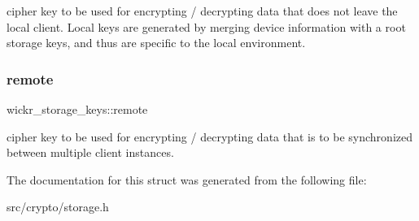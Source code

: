 cipher key to be used for encrypting / decrypting data that does not leave the local client. Local keys are generated by merging device information with a root storage keys, and thus are specific to the local environment. \mbox{\label{structwickr__storage__keys_a44b6a0b14bcc877cb6799265b060cb28}} 
\subsubsection{\texorpdfstring{remote}{remote}}
{\footnotesize\ttfamily wickr\+\_\+storage\+\_\+keys\+::remote}

cipher key to be used for encrypting / decrypting data that is to be synchronized between multiple client instances. 

The documentation for this struct was generated from the following file\+:\begin{DoxyCompactItemize}
\item 
src/crypto/storage.\+h\end{DoxyCompactItemize}
